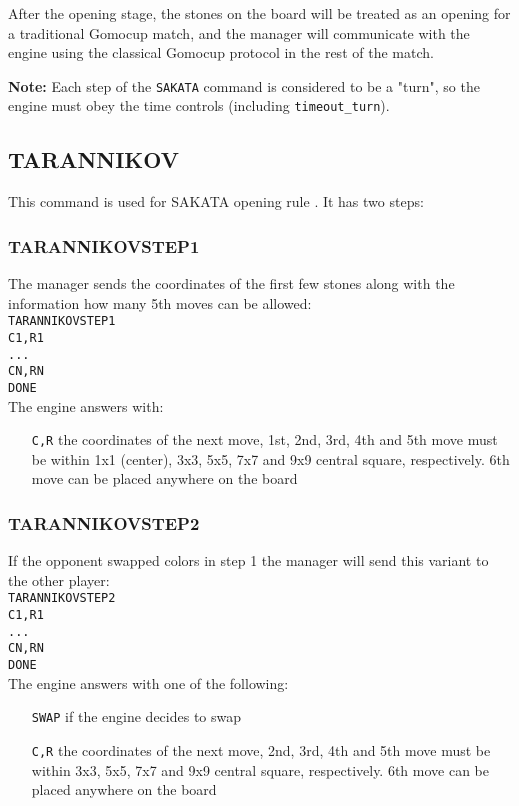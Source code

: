 \documentclass[12pt,a4paper]{article}
\begin{document}
After the opening stage, the stones on the board will be treated as an opening for a traditional Gomocup match, and the manager will communicate with the engine using the classical Gomocup protocol in the rest of the match.

\textbf{Note:} Each step of the \texttt{SAKATA} command is considered to be a "turn", so the engine must obey the time controls (including \texttt{timeout{\_}turn}).


\subsection{TARANNIKOV}
\label{cmd_tarannikov}
This command is used for SAKATA opening rule \cite{renju_opening_rules}. It has two steps:

\subsubsection{TARANNIKOVSTEP1}
The manager sends the coordinates of the first few stones along with the information how many 5th moves can be allowed:\\
\texttt{TARANNIKOVSTEP1}\\
\texttt{C1,R1}\\
\texttt{...}\\
\texttt{CN,RN}\\
\texttt{DONE}\\
The engine answers with:
\begin{enumerate}[leftmargin=7.5em]
\item[\texttt{C,R}]{the coordinates of the next move, 1st, 2nd, 3rd, 4th and 5th move must be within 1x1 (center), 3x3, 5x5, 7x7 and 9x9 central square, respectively. 6th move can be placed anywhere on the board}
\end{enumerate}

\subsubsection{TARANNIKOVSTEP2}
If the opponent swapped colors in step 1 the manager will send this variant to the other player:\\
\texttt{TARANNIKOVSTEP2}\\
\texttt{C1,R1}\\
\texttt{...}\\
\texttt{CN,RN}\\
\texttt{DONE}\\
The engine answers with one of the following:
\begin{enumerate}[leftmargin=7.5em]
\item[\texttt{SWAP}]{if the engine decides to swap}
\item[\texttt{C,R}]{the coordinates of the next move, 2nd, 3rd, 4th and 5th move must be within 3x3, 5x5, 7x7 and 9x9 central square, respectively. 6th move can be placed anywhere on the board}
\end{enumerate}
\end{document}
